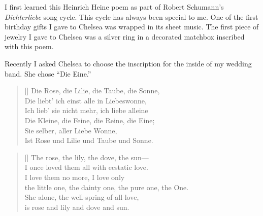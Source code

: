 I first learned this Heinrich Heine poem as part of Robert Schumann's {\it
Dichterliebe} song cycle. This cycle has always been special to me. One of the
first birthday gifts I gave to Chelsea was wrapped in its sheet music.  The
first piece of jewelry I gave to Chelsea was a silver ring in a decorated
matchbox inscribed with this poem.

Recently I asked Chelsea to choose the inscription for the inside of my
wedding band. She chose ``Die Eine.''

\settowidth{\versewidth}{the little one, the dainty one, the pure one, the One.}
\begin{verse}[\versewidth]
Die Rose, die Lilie, die Taube, die Sonne,\\
Die liebt' ich einst alle in Liebeswonne,\\
Ich lieb' sie nicht mehr, ich liebe alleine\\
Die Kleine, die Feine, die Reine, die Eine;\\
Sie selber, aller Liebe Wonne,\\
Ist Rose und Lilie und Taube und Sonne.\\
\end{verse}
\settowidth{\versewidth}{the little one, the dainty one, the pure one, the One.}
\begin{verse}[\versewidth]
The rose, the lily, the dove, the sun---\\
I once loved them all with ecstatic love.\\
I love them no more, I love only\\
the little one, the dainty one, the pure one, the One.\\
She alone, the well-spring of all love,\\
is rose and lily and dove and sun.\\
\end{verse}
